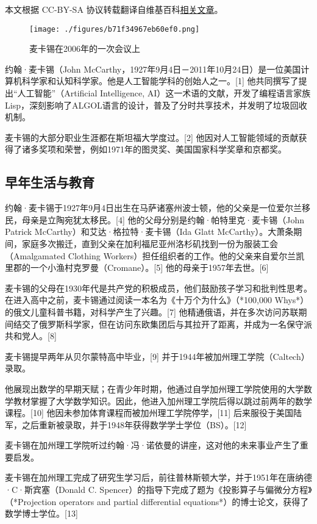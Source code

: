 
本文根据 CC-BY-SA 协议转载翻译自维基百科\href{https://en.wikipedia.org/wiki/Maxwell\%27s_equations}{相关文章}。

\begin{figure}[ht]
\centering
\texttt{[image: ./figures/b71f34967eb60ef0.png]}
\caption{麦卡锡在2006年的一次会议上} \label{fig_YHMKX_1}
\end{figure}
约翰·麦卡锡（John McCarthy，1927年9月4日－2011年10月24日）是一位美国计算机科学家和认知科学家。他是人工智能学科的创始人之一。[1] 他共同撰写了提出“人工智能”（Artificial Intelligence, AI）这一术语的文献，开发了编程语言家族Lisp，深刻影响了ALGOL语言的设计，普及了分时共享技术，并发明了垃圾回收机制。

麦卡锡的大部分职业生涯都在斯坦福大学度过。[2] 他因对人工智能领域的贡献获得了诸多奖项和荣誉，例如1971年的图灵奖、美国国家科学奖章和京都奖。
\subsection{早年生活与教育}
约翰·麦卡锡于1927年9月4日出生在马萨诸塞州波士顿，他的父亲是一位爱尔兰移民，母亲是立陶宛犹太移民。[4] 他的父母分别是约翰·帕特里克·麦卡锡（John Patrick McCarthy）和艾达·格拉特·麦卡锡（Ida Glatt McCarthy）。大萧条期间，家庭多次搬迁，直到父亲在加利福尼亚州洛杉矶找到一份为服装工会（Amalgamated Clothing Workers）担任组织者的工作。他的父亲来自爱尔兰凯里郡的一个小渔村克罗曼（Cromane）。[5] 他的母亲于1957年去世。[6]

麦卡锡的父母在1930年代是共产党的积极成员，他们鼓励孩子学习和批判性思考。在进入高中之前，麦卡锡通过阅读一本名为《十万个为什么》（*100,000 Whys*）的俄文儿童科普书籍，对科学产生了兴趣。[7] 他精通俄语，并在多次访问苏联期间结交了俄罗斯科学家，但在访问东欧集团后与其拉开了距离，并成为一名保守派共和党人。[8]

麦卡锡提早两年从贝尔蒙特高中毕业，[9] 并于1944年被加州理工学院（Caltech）录取。

他展现出数学的早期天赋；在青少年时期，他通过自学加州理工学院使用的大学数学教材掌握了大学数学知识。因此，他进入加州理工学院后得以跳过前两年的数学课程。[10] 他因未参加体育课程而被加州理工学院停学，[11] 后来服役于美国陆军，之后重新被录取，并于1948年获得数学学士学位（BS）。[12]

麦卡锡在加州理工学院听过约翰·冯·诺依曼的讲座，这对他的未来事业产生了重要启发。

麦卡锡在加州理工完成了研究生学习后，前往普林斯顿大学，并于1951年在唐纳德·C·斯宾塞（Donald C. Spencer）的指导下完成了题为《投影算子与偏微分方程》（*Projection operators and partial differential equations*）的博士论文，获得了数学博士学位。[13]
